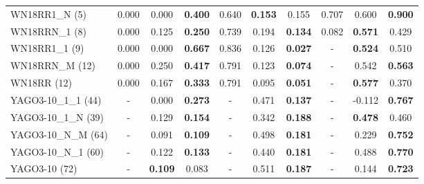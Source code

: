 \begin{table}[t]
{\begin{tabular}{l||ccc|ccc|ccc}
WN18RR1\_N (5) & 0.000 & 0.000 & \textbf{0.400} & 0.640 & \textbf{0.153} & 0.155 & 0.707 & 0.600 & \textbf{0.900} \\
WN18RRN\_1 (8) & 0.000 & 0.125 & \textbf{0.250} & 0.739 & 0.194 & \textbf{0.134} & 0.082 & \textbf{0.571} & 0.429 \\
WN18RR1\_1 (9) & 0.000 & 0.000 & \textbf{0.667} & 0.836 & 0.126 & \textbf{0.027} & - & \textbf{0.524} & 0.510 \\
WN18RRN\_M (12) & 0.000 & 0.250 & \textbf{0.417} & 0.791 & 0.123 & \textbf{0.074} & - & 0.542 & \textbf{0.563} \\
WN18RR (12) & 0.000 & 0.167 & \textbf{0.333} & 0.791 & 0.095 & \textbf{0.051} & - & \textbf{0.577} & 0.370 \\
YAGO3-10\_1\_1 (44) & - & 0.000 & \textbf{0.273} & - & 0.471 & \textbf{0.137} & - & -0.112 & \textbf{0.767} \\
YAGO3-10\_1\_N (39) & - & 0.129 & \textbf{0.154} & - & 0.342 & \textbf{0.188} & - & \textbf{0.478} & 0.460 \\
YAGO3-10\_N\_M (64) & - & 0.091 & \textbf{0.109} & - & 0.498 & \textbf{0.181} & - & 0.229 & \textbf{0.752} \\
YAGO3-10\_N\_1 (60) & - & 0.122 & \textbf{0.133} & - & 0.440 & \textbf{0.181} & - & 0.488 & \textbf{0.770} \\
YAGO3-10 (72) & - & \textbf{0.109} & 0.083 & - & 0.511 & \textbf{0.187} & - & 0.144 & \textbf{0.723} \\
\hline
\end{tabular}%
}
\end{table}
